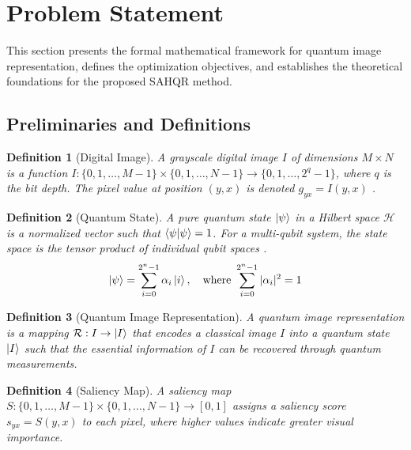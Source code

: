\documentclass{ipol}
\newtheorem{definition}{Definition}
\begin{document}

\section{Problem Statement}\label{sec:problem}

This section presents the formal mathematical framework for quantum image representation, defines the optimization objectives, and establishes the theoretical foundations for the proposed SAHQR method.

\subsection{Preliminaries and Definitions}

\begin{definition}[Digital Image]
A grayscale digital image $I$ of dimensions $M \times N$ is a function $I: \{0, 1, \ldots, M-1\} \times \{0, 1, \ldots, N-1\} \rightarrow \{0, 1, \ldots, 2^q - 1\}$, where $q$ is the bit depth. The pixel value at position $(y, x)$ is denoted $g_{yx} = I(y, x)$ \cite{bib62}.
\end{definition}

\begin{definition}[Quantum State]
A pure quantum state $\ket{\psi}$ in a Hilbert space $\mathcal{H}$ is a normalized vector such that $\braket{\psi|\psi} = 1$. For a multi-qubit system, the state space is the tensor product of individual qubit spaces \cite{bib63}.
\begin{equation}
\ket{\psi} = \sum_{i=0}^{2^n - 1} \alpha_i \ket{i}, \quad \text{where } \sum_{i=0}^{2^n - 1} |\alpha_i|^2 = 1
\label{eq:quantum_state}
\end{equation}
\end{definition}

\begin{definition}[Quantum Image Representation]
A quantum image representation is a mapping $\mathcal{R}: I \rightarrow \ket{I}$ that encodes a classical image $I$ into a quantum state $\ket{I}$ such that the essential information of $I$ can be recovered through quantum measurements.
\end{definition}

\begin{definition}[Saliency Map]
A saliency map $S: \{0, 1, \ldots, M-1\} \times \{0, 1, \ldots, N-1\} \rightarrow [0, 1]$ assigns a saliency score $s_{yx} = S(y, x)$ to each pixel, where higher values indicate greater visual importance.
\end{definition}
\end{document}
